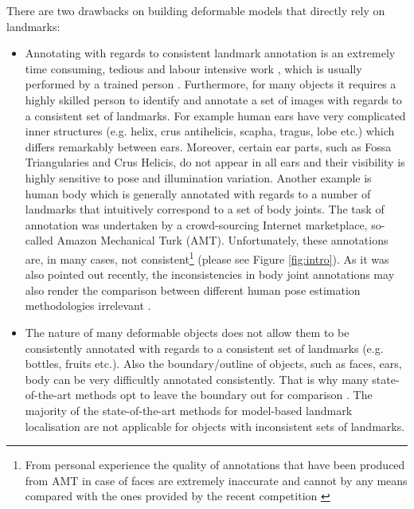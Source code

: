There are two drawbacks on building deformable models that directly rely on landmarks:
\begin{itemize}

\item Annotating with regards to consistent landmark annotation is an extremely time consuming, tedious and labour intensive work \cite{sagonas_iccv_300w_2013}, which is usually performed by a trained person . Furthermore, for many objects it requires a highly skilled person to identify and annotate a set of images with regards to a consistent set of landmarks. For example human ears have very complicated inner structures (e.g. helix, crus antihelicis, scapha, tragus, lobe etc.) which differs remarkably between ears. Moreover, certain ear parts, such as  Fossa Triangularies and Crus Helicis, do not appear in all ears and  their visibility is highly sensitive to pose and illumination variation. Another example is human body which is generally annotated with regards to a number of landmarks that intuitively correspond to a set of body joints. The task of annotation was undertaken by a crowd-sourcing Internet marketplace, so-called Amazon Mechanical Turk (AMT). Unfortunately, these annotations are, in many cases, not consistent\footnote{From personal experience the quality of annotations that have been produced from AMT in case of faces are extremely inaccurate and cannot by any means compared with the ones provided by the recent competition \cite{sagonas_iccv_300w_2013}} (please see Figure \ref{fig:intro}). As it was also pointed out recently, the inconsistencies in body joint annotations may also render the comparison between different human pose estimation methodologies irrelevant \cite{tompson2015efficient}. 

\item The nature of many deformable objects does not allow them to be consistently annotated with regards to a consistent set of landmarks (e.g. bottles, fruits etc.). Also the boundary/outline of objects, such as faces, ears, body can be very difficultly annotated consistently. That is why many state-of-the-art methods opt to leave the boundary out for comparison \cite{Tzimiropoulos2014, Asthana2014}. The majority of the state-of-the-art methods for model-based landmark localisation \cite{Cao2012, Zhu2012, Xiong2013, Tzimiropoulos2014, Asthana2014} are not applicable for objects with inconsistent sets of landmarks.

\end{itemize}

